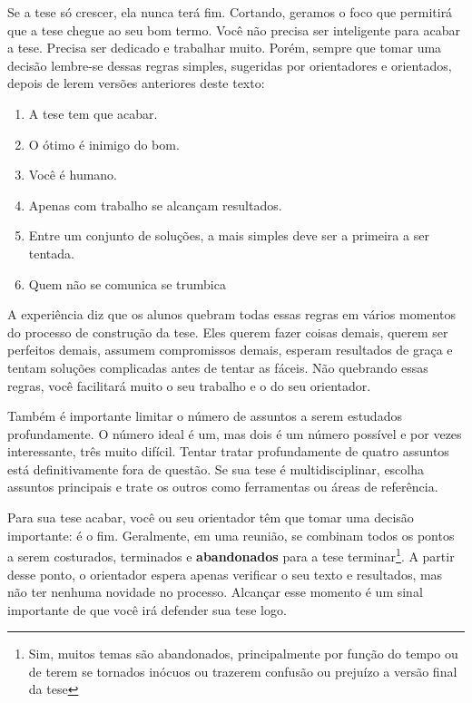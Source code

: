 Se a tese só crescer, ela nunca terá fim. Cortando, geramos o foco que permitirá que a tese chegue ao seu bom termo.
Você não precisa ser inteligente para acabar a tese. Precisa ser dedicado e trabalhar muito. Porém, sempre que tomar uma decisão lembre-se dessas regras simples, sugeridas por orientadores e orientados, depois de lerem versões anteriores deste texto:
\begin{enumerate}
    \item A tese tem que acabar. 
    \item O ótimo é inimigo do bom.
    \item Você é humano.
   \item 	Apenas com trabalho se alcançam resultados.
\item	Entre um conjunto de soluções, a mais simples deve ser a primeira a ser tentada.
\item	Quem não se comunica se trumbica 
\end{enumerate}
	

A experiência diz que os alunos quebram todas essas regras em vários momentos do processo de construção da tese. Eles querem fazer coisas demais, querem ser perfeitos demais, assumem compromissos demais, esperam resultados de graça e tentam soluções complicadas antes de tentar as fáceis. Não quebrando essas  regras, você facilitará muito o seu trabalho e o do seu orientador.

Também é importante limitar o número de assuntos a serem estudados profundamente. O número ideal é um, mas dois é um número possível e por vezes interessante, três muito difícil. Tentar tratar profundamente de quatro assuntos está definitivamente fora de questão. Se sua tese é multidisciplinar, escolha assuntos principais e trate os outros como ferramentas ou áreas de referência.

Para sua tese acabar, você ou seu orientador têm que tomar uma decisão importante: é o fim. Geralmente, em uma reunião, se combinam todos os pontos a serem costurados, terminados e \textbf{abandonados} para a tese terminar\footnote{Sim, muitos temas são abandonados, principalmente por função do tempo ou de terem se tornados inócuos ou trazerem confusão ou prejuízo a versão final da tese}. A partir desse ponto, o orientador espera apenas verificar o seu texto e resultados, mas não ter nenhuma novidade no processo. Alcançar esse momento é um sinal importante de que você irá defender sua tese logo.




